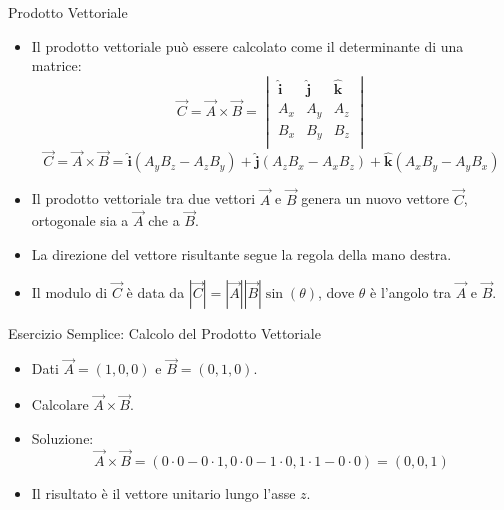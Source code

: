\documentclass{beamer}
\begin{document}
\begin{frame}{Prodotto Vettoriale}
    \begin{itemize}
 
        \item Il prodotto vettoriale può essere calcolato come il determinante di una matrice:
        \begin{equation*}
        \vec{C} =\vec{A} \times \vec{B} = \begin{vmatrix}
        \mathbf{\hat{i}} & \mathbf{\hat{j}} & \mathbf{\hat{k}} \\
        A_x & A_y & A_z \\
        B_x & B_y & B_z \\
        \end{vmatrix}\end{equation*}
        $$ \vec{C} =\vec{A} \times \vec{B} =  \mathbf{\hat{i}} (A_y B_z - A_z B_y) +  \mathbf{\hat{j}}(A_z B_x - A_x B_z) +  \mathbf{\hat{k}}(A_x B_y - A_y B_x)
        $$
        \item Il prodotto vettoriale tra due vettori \( \vec{A} \) e \( \vec{B} \) genera un nuovo vettore \( \vec{C} \), ortogonale sia a \( \vec{A} \) che a \( \vec{B} \).
        \item La direzione del vettore risultante segue la regola della mano destra.
        \item Il modulo di \( \vec{C} \) è data da \( |\vec{C}| = |\vec{A}||\vec{B}| \sin(\theta) \), dove \( \theta \) è l'angolo tra \( \vec{A} \) e \( \vec{B} \).
    \end{itemize}
\end{frame}

\begin{frame}{Esercizio Semplice: Calcolo del Prodotto Vettoriale}
    \begin{itemize}
        \item Dati \( \vec{A} = (1, 0, 0) \) e \( \vec{B} = (0, 1, 0) \).
        \item Calcolare \( \vec{A} \times \vec{B} \).
        \item Soluzione:
        \[
        \vec{A} \times \vec{B} = (0 \cdot 0 - 0 \cdot 1, 0 \cdot 0 - 1 \cdot 0, 1 \cdot 1 - 0 \cdot 0) = (0, 0, 1)
        \]
        \item Il risultato è il vettore unitario lungo l'asse \( z \).
    \end{itemize}
\end{frame}
\end{document}
